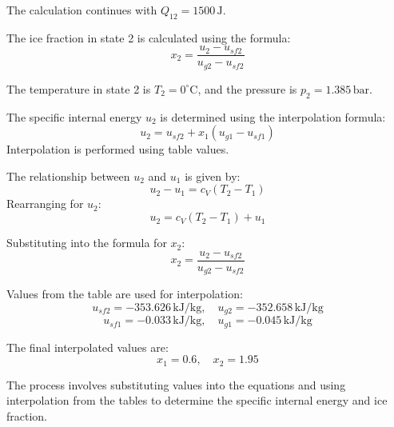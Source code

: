 The calculation continues with \( Q_{12} = 1500 \, \text{J} \).  

The ice fraction in state 2 is calculated using the formula:  
\[
x_2 = \frac{u_2 - u_{sf2}}{u_{g2} - u_{sf2}}
\]  

The temperature in state 2 is \( T_2 = 0^\circ\text{C} \), and the pressure is \( p_2 = 1.385 \, \text{bar} \).  

The specific internal energy \( u_2 \) is determined using the interpolation formula:  
\[
u_2 = u_{sf2} + x_1 (u_{g1} - u_{sf1})
\]  
Interpolation is performed using table values.  

The relationship between \( u_2 \) and \( u_1 \) is given by:  
\[
u_2 - u_1 = c_V (T_2 - T_1)
\]  
Rearranging for \( u_2 \):  
\[
u_2 = c_V (T_2 - T_1) + u_1
\]  

Substituting into the formula for \( x_2 \):  
\[
x_2 = \frac{u_2 - u_{sf2}}{u_{g2} - u_{sf2}}
\]  

Values from the table are used for interpolation:  
\[
u_{sf2} = -353.626 \, \text{kJ/kg}, \quad u_{g2} = -352.658 \, \text{kJ/kg}
\]  
\[
u_{sf1} = -0.033 \, \text{kJ/kg}, \quad u_{g1} = -0.045 \, \text{kJ/kg}
\]  

The final interpolated values are:  
\[
x_1 = 0.6, \quad x_2 = 1.95
\]  

The process involves substituting values into the equations and using interpolation from the tables to determine the specific internal energy and ice fraction.